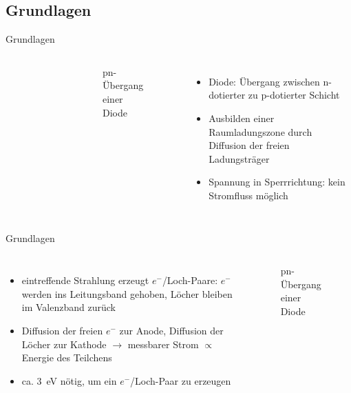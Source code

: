 \subsection[]{Grundlagen}

\begin{frame}{Grundlagen}
    \begin{columns}[T]
	    	\vspace{-0.5cm}
			\begin{figure}[htbp]
			  \centering
			  
			\end{figure}
			\vspace{-1.2cm}
			\begin{figure}[htbp]
			  \centering
			   
			   \vspace{-0.5cm}
			  \caption{pn-Übergang einer Diode}
			\end{figure}
			
	    	\begin{itemize}
	    	  \item Diode: Übergang zwischen n-dotierter zu p-dotierter Schicht
			  \item Ausbilden einer Raumladungszone durch Diffusion der freien Ladungsträger
			  \item Spannung in Sperrrichtung: kein Stromfluss möglich
			\end{itemize}
    \end{columns}
\end{frame}

\begin{frame}{Grundlagen}
    \begin{columns}[T]	
	    	\begin{itemize}
	    	  \item eintreffende Strahlung erzeugt $e^-$/Loch-Paare: $e^-$ werden ins Leitungsband
	    	  gehoben, Löcher bleiben im Valenzband zurück
	    	  \item Diffusion der freien $e^-$ zur Anode, Diffusion der Löcher zur Kathode $\rightarrow$
	    	  messbarer Strom $\propto$ Energie des Teilchens
	    	  \item ca. 3~eV nötig, um ein $e^-$/Loch-Paar zu erzeugen
			\end{itemize}
			
			\begin{figure}[htbp]
			  \centering
			   
			  \caption{pn-Übergang einer Diode}
			\end{figure}
    \end{columns}
\end{frame}
